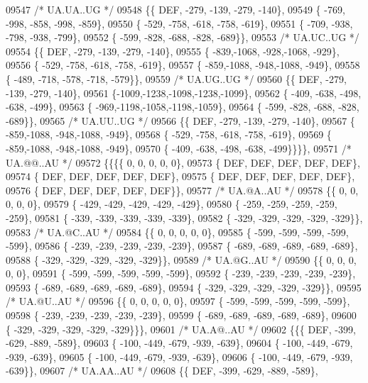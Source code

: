 \begin{DoxyCode}
09547 \textcolor{comment}{/* UA.UA..UG */}
09548 \{\{  DEF, -279, -139, -279, -140\},
09549 \{ -769, -998, -858, -998, -859\},
09550 \{ -529, -758, -618, -758, -619\},
09551 \{ -709, -938, -798, -938, -799\},
09552 \{ -599, -828, -688, -828, -689\}\},
09553 \textcolor{comment}{/* UA.UC..UG */}
09554 \{\{  DEF, -279, -139, -279, -140\},
09555 \{ -839,-1068, -928,-1068, -929\},
09556 \{ -529, -758, -618, -758, -619\},
09557 \{ -859,-1088, -948,-1088, -949\},
09558 \{ -489, -718, -578, -718, -579\}\},
09559 \textcolor{comment}{/* UA.UG..UG */}
09560 \{\{  DEF, -279, -139, -279, -140\},
09561 \{-1009,-1238,-1098,-1238,-1099\},
09562 \{ -409, -638, -498, -638, -499\},
09563 \{ -969,-1198,-1058,-1198,-1059\},
09564 \{ -599, -828, -688, -828, -689\}\},
09565 \textcolor{comment}{/* UA.UU..UG */}
09566 \{\{  DEF, -279, -139, -279, -140\},
09567 \{ -859,-1088, -948,-1088, -949\},
09568 \{ -529, -758, -618, -758, -619\},
09569 \{ -859,-1088, -948,-1088, -949\},
09570 \{ -409, -638, -498, -638, -499\}\}\}\},
09571 \textcolor{comment}{/* UA.@@..AU */}
09572 \{\{\{\{    0,    0,    0,    0,    0\},
09573 \{  DEF,  DEF,  DEF,  DEF,  DEF\},
09574 \{  DEF,  DEF,  DEF,  DEF,  DEF\},
09575 \{  DEF,  DEF,  DEF,  DEF,  DEF\},
09576 \{  DEF,  DEF,  DEF,  DEF,  DEF\}\},
09577 \textcolor{comment}{/* UA.@A..AU */}
09578 \{\{    0,    0,    0,    0,    0\},
09579 \{ -429, -429, -429, -429, -429\},
09580 \{ -259, -259, -259, -259, -259\},
09581 \{ -339, -339, -339, -339, -339\},
09582 \{ -329, -329, -329, -329, -329\}\},
09583 \textcolor{comment}{/* UA.@C..AU */}
09584 \{\{    0,    0,    0,    0,    0\},
09585 \{ -599, -599, -599, -599, -599\},
09586 \{ -239, -239, -239, -239, -239\},
09587 \{ -689, -689, -689, -689, -689\},
09588 \{ -329, -329, -329, -329, -329\}\},
09589 \textcolor{comment}{/* UA.@G..AU */}
09590 \{\{    0,    0,    0,    0,    0\},
09591 \{ -599, -599, -599, -599, -599\},
09592 \{ -239, -239, -239, -239, -239\},
09593 \{ -689, -689, -689, -689, -689\},
09594 \{ -329, -329, -329, -329, -329\}\},
09595 \textcolor{comment}{/* UA.@U..AU */}
09596 \{\{    0,    0,    0,    0,    0\},
09597 \{ -599, -599, -599, -599, -599\},
09598 \{ -239, -239, -239, -239, -239\},
09599 \{ -689, -689, -689, -689, -689\},
09600 \{ -329, -329, -329, -329, -329\}\}\},
09601 \textcolor{comment}{/* UA.A@..AU */}
09602 \{\{\{  DEF, -399, -629, -889, -589\},
09603 \{ -100, -449, -679, -939, -639\},
09604 \{ -100, -449, -679, -939, -639\},
09605 \{ -100, -449, -679, -939, -639\},
09606 \{ -100, -449, -679, -939, -639\}\},
09607 \textcolor{comment}{/* UA.AA..AU */}
09608 \{\{  DEF, -399, -629, -889, -589\},

\end{DoxyCode}
